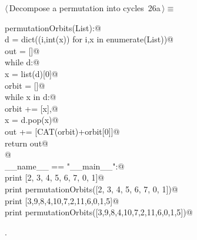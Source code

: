 \documentclass[11pt,oneside]{article}	%
\begin{document}
\begin{flushleft} \small
\begin{minipage}{\linewidth} \label{scrap64}
\protect{}$\langle\,$Decompose a permutation into cycles\nobreak\ {\footnotesize 26a}$\,\rangle\equiv$
\vspace{-1ex}
\begin{list}{}{} \item
\mbox{}\verb@def permutationOrbits(List):@\\
\mbox{}\verb@   d = dict((i,int(x)) for i,x in enumerate(List))@\\
\mbox{}\verb@   out = []@\\
\mbox{}\verb@   while d:@\\
\mbox{}\verb@      x = list(d)[0]@\\
\mbox{}\verb@      orbit = []@\\
\mbox{}\verb@      while x in d:@\\
\mbox{}\verb@         orbit += [x],@\\
\mbox{}\verb@         x = d.pop(x)@\\
\mbox{}\verb@      out += [CAT(orbit)+orbit[0]]@\\
\mbox{}\verb@   return out@\\
\mbox{}\verb@      @\\
\mbox{}\verb@if __name__ == "__main__":@\\
\mbox{}\verb@   print [2, 3, 4, 5, 6, 7, 0, 1]@\\
\mbox{}\verb@   print permutationOrbits([2, 3, 4, 5, 6, 7, 0, 1])@\\
\mbox{}\verb@   print [3,9,8,4,10,7,2,11,6,0,1,5]@\\
\mbox{}\verb@   print permutationOrbits([3,9,8,4,10,7,2,11,6,0,1,5])@\\
\mbox{}\verb@@{\NWsep}
\end{list}
\vspace{-1ex}
\footnotesize\addtolength{\baselineskip}{-1ex}
\begin{list}{}{\setlength{\itemsep}{-\parsep}\setlength{\itemindent}{-\leftmargin}}
\item {\NWtxtMacroNoRef}.
\end{list}
\end{minipage}\\[4ex]
\end{flushleft}
\end{document}
